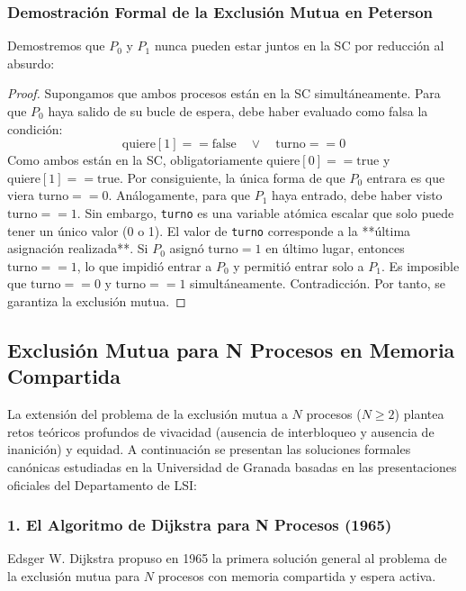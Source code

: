 \subsubsection{Demostración Formal de la Exclusión Mutua en Peterson}
Demostremos que $P_0$ y $P_1$ nunca pueden estar juntos en la SC por reducción al absurdo:
\begin{proof}
Supongamos que ambos procesos están en la SC simultáneamente. Para que $P_0$ haya salido de su bucle de espera, debe haber evaluado como falsa la condición:
\[
\text{quiere}[1] == \text{false} \quad \lor \quad \text{turno} == 0
\]
Como ambos están en la SC, obligatoriamente $\text{quiere}[0] == \text{true}$ y $\text{quiere}[1] == \text{true}$. Por consiguiente, la única forma de que $P_0$ entrara es que viera $\text{turno} == 0$.
Análogamente, para que $P_1$ haya entrado, debe haber visto $\text{turno} == 1$.
Sin embargo, \texttt{turno} es una variable atómica escalar que solo puede tener un único valor (0 o 1). El valor de \texttt{turno} corresponde a la **última asignación realizada**.
Si $P_0$ asignó $\text{turno} = 1$ en último lugar, entonces $\text{turno} == 1$, lo que impidió entrar a $P_0$ y permitió entrar solo a $P_1$. Es imposible que $\text{turno} == 0$ y $\text{turno} == 1$ simultáneamente. Contradicción. Por tanto, se garantiza la exclusión mutua.
\end{proof}

\subsection{Exclusión Mutua para N Procesos en Memoria Compartida}
La extensión del problema de la exclusión mutua a $N$ procesos ($N \ge 2$) plantea retos teóricos profundos de vivacidad (ausencia de interbloqueo y ausencia de inanición) y equidad. A continuación se presentan las soluciones formales canónicas estudiadas en la Universidad de Granada basadas en las presentaciones oficiales del Departamento de LSI:

\subsubsection{1. El Algoritmo de Dijkstra para N Procesos (1965)}
Edsger W. Dijkstra propuso en 1965 la primera solución general al problema de la exclusión mutua para $N$ procesos con memoria compartida y espera activa.

